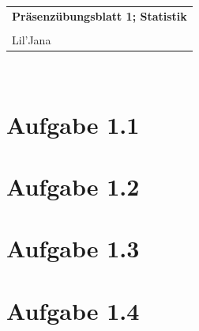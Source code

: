 \documentclass{article} %
\newcommand{\titulo}{Präsenzübungsblatt 1; Statistik}
\newcommand{\nombre}{Lil'Jana}
\begin{document}
\begin{tabular}{p{12cm}}
{{\Large\bf\titulo}}\\
\vspace{0.2cm}\\
 {\large\nombre}\\
\end{tabular}
\vspace{0.2cm}\\
\section{Aufgabe 1.1}

\section{Aufgabe 1.2}

\section{Aufgabe 1.3}

\section{Aufgabe 1.4}
\end{document}

